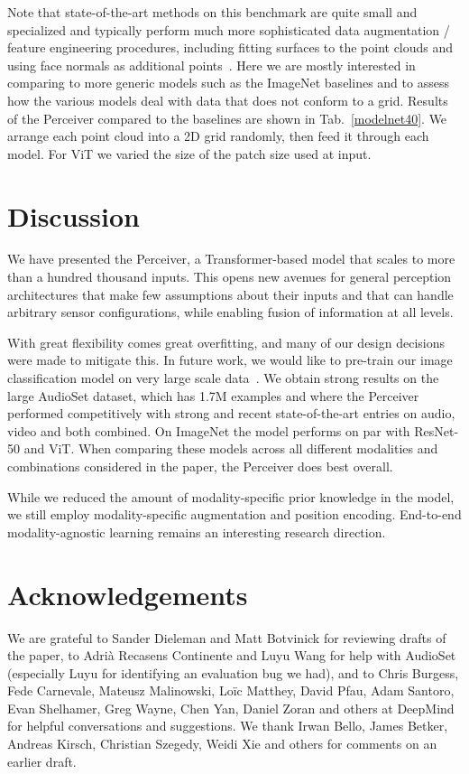 \documentclass{article}
\begin{document}
Note that state-of-the-art methods on this benchmark are quite small and specialized and typically perform much more sophisticated data augmentation / feature engineering procedures, including fitting surfaces to the point clouds and using face normals as additional points~\cite{qi2017pointnet++}. Here we are mostly interested in comparing to more generic models such as the ImageNet baselines and to assess how the various models deal with data that does not conform to a grid. Results of the Perceiver compared to the baselines are shown in Tab.~\ref{modelnet40}. We arrange each point cloud into a 2D grid randomly, then feed it through each model. For ViT we varied the size of the patch size used at input.

\section{Discussion}

We have presented the Perceiver, a Transformer-based model that scales to more than a hundred thousand inputs. This opens new avenues for general perception architectures that make few assumptions about their inputs and that can handle arbitrary sensor configurations, while enabling fusion of information at all levels.

With great flexibility comes great overfitting, and many of our design decisions were made to mitigate this. In future work, we would like to pre-train our image classification model on very large scale data~\cite{dosovitskiy2020image}. We obtain strong results on  the large AudioSet dataset, which has 1.7M examples and where the Perceiver performed competitively with strong and recent state-of-the-art entries on audio, video and both combined. On ImageNet the model performs on par with ResNet-50 and ViT. When comparing these models across all different modalities and combinations considered in the paper, the Perceiver does best overall.

While we reduced the amount of modality-specific prior knowledge in the model, we still employ modality-specific augmentation and position encoding. End-to-end modality-agnostic learning remains an interesting research direction. 

\section*{Acknowledgements}

We are grateful to Sander Dieleman and Matt Botvinick for reviewing drafts of the paper, to Adri\`{a} Recasens Continente and Luyu Wang for help with AudioSet (especially Luyu for identifying an evaluation bug we had), and to Chris Burgess, Fede Carnevale, Mateusz Malinowski, Lo\"{i}c Matthey, David Pfau, Adam Santoro, Evan Shelhamer, Greg Wayne, Chen Yan, Daniel Zoran and others at DeepMind for helpful conversations and suggestions. We thank Irwan Bello, James Betker, Andreas Kirsch, Christian Szegedy, Weidi Xie and others for comments on an earlier draft.
\end{document}
